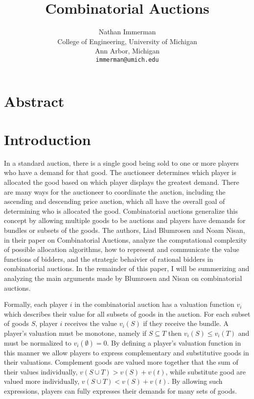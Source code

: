 \documentclass[10pt,onecolumn,letterpaper]{article}
\theoremstyle{definition}
\begin{document}
\title{Combinatorial Auctions}

\author{Nathan Immerman\\
College of Engineering, University of Michigan\\
Ann Arbor, Michigan\\
{\tt\small immerman@umich.edu}
}

\maketitle


\section{Abstract}

\section{Introduction}

In a standard auction,  there is a single good being sold to one or more players who have a demand for that good. The auctioneer determines which player is allocated the good based on which player displays the greatest demand. There are many ways for the auctioneer to coordinate the auction, including the ascending and descending price auction, which all have the overall goal of determining who is allocated the good. Combinatorial auctions generalize this concept by allowing multiple goods to be auctions and players have demands for bundles or subsets of the goods. The authors, Liad Blumrosen and Noam Nisan, in their paper on Combinatorial Auctions, analyze the computational complexity of possible allocation algorithms, how to represent and communicate the value functions of bidders, and the strategic behaivier of rational bidders in combinatorial auctions. In the remainder of this paper, I will be summerizing and analyzing the main arguments made by Blumrosen and Nisan on combinatorial auctions. 

Formally, each player $i$ in the combinatorial auction has a valuation function $v_i$ which describes their value for all subsets of goods in the auction. For each subset of goods $S$, player $i$ receives the value $v_i(S)$ if they receive the bundle. A player's valuation must be monotone, namely if $S \subseteq T$ then $v_i(S) \leq v_i(T)$ and must be normalized to $v_i(\emptyset)= 0$. By defining a player's valuation function in this manner we allow players to express complementary and substitutive goods in their valuations. Complement goods are valued more together that the sum of their values individually, $v(S \cup T) > v(S) + v(t)$, while substitute good are valued more individually, $v(S \cup T) < v(S) + v(t)$. By allowing such expressions, players can fully expresses their demands for many sets of goods.
\end{document}
